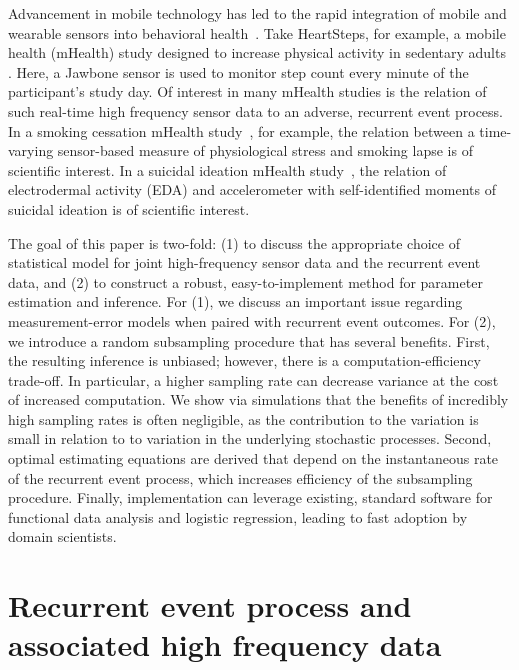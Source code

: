 \documentclass[11pt]{amsart}
\begin{document}
Advancement in mobile technology has led to the rapid integration of
mobile and wearable sensors into behavioral health~\citep{Freeetal2013}.
Take HeartSteps, for example, a mobile health (mHealth) study designed
to increase physical activity in sedentary adults
\citep{KlasnjaHS2019}. Here, a Jawbone sensor is used to monitor step
count every minute of the participant's study day.
Of interest in many mHealth studies is the relation of such
real-time high frequency sensor data to an adverse, recurrent event
process. In a smoking cessation mHealth study~\citep{Sense2Stop}, for
example, the relation between a time-varying sensor-based measure of
physiological stress and smoking lapse is of scientific interest.
In a suicidal ideation mHealth study~\citep{Kleiman2018}, the relation of
electrodermal activity (EDA) and accelerometer with self-identified
moments of suicidal ideation is of scientific interest.


The goal of this paper is two-fold: (1) to discuss the appropriate
choice of statistical model for joint high-frequency sensor data and
the recurrent event data, and (2) to construct a robust,
easy-to-implement method for parameter estimation and inference. 
For (1), we discuss an important issue regarding measurement-error
models when paired with recurrent event outcomes.
For (2), we introduce a random subsampling procedure that has
several benefits.  First, the resulting inference is unbiased;
however, there is a computation-efficiency trade-off. In particular, a
higher sampling rate can decrease variance at the cost of increased
computation.  We show via simulations that the benefits of incredibly
high sampling rates is often negligible, as the contribution to the
variation is small in relation to to variation in the underlying
stochastic processes. Second, optimal estimating equations are derived
that depend on the instantaneous rate of the recurrent event process,
which increases efficiency of the subsampling procedure. 
Finally, implementation can leverage existing, standard software for
functional data analysis and logistic regression, leading to fast
adoption by domain scientists. 

\section{Recurrent event process and associated high frequency data}
\end{document}
